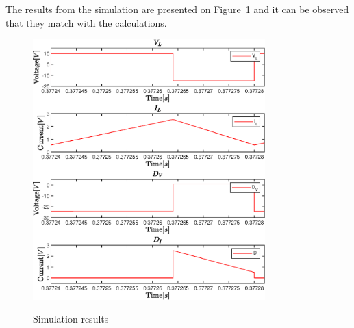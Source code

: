 The results from the simulation are presented on Figure~\ref{fig:CBC_SimResults} and it can be observed that they match with the calculations. 

\begin{figure}[H]%
    \centering
    {{\includegraphics[width=0.8\textwidth]{figures/aConventionalBoost/CBC_V_LtoI_D.eps} }}%
    \qquad
    \caption{Simulation results}%
     \label{fig:CBC_SimResults}%
\end{figure}